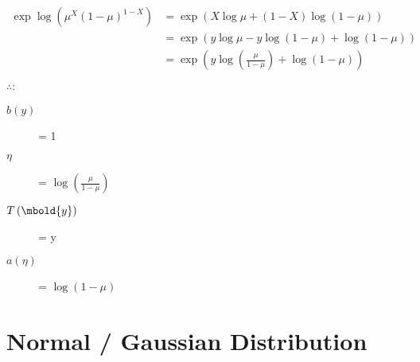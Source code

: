 \documentclass[12pt letter]{report}
\begin{document}
\begin{align*}
  \exp \log \left( \mu^{X} \left( 1 - \mu \right)^{1 - X} \right) & = \exp \left( X \log \mu + \left( 1 - X \right) \log \left( 1 - \mu \right) \right)                  \\
                                                                  & = \exp \left( y \log \mu  - y \log \left( 1 - \mu
  \right) + \log \left( 1 - \mu  \right)   \right)                                                                                                                       \\
                                                                  & = \exp \left( y \log \left( \frac{\mu  }{1 - \mu }  \right) + \log \left( 1 - \mu  \right)   \right) \\
\end{align*}
$\therefore$:
\begin{description}
  \item[ $b \left( y \right) $] = 1
  \item [ $\eta$] = $\log \left( \frac{\mu}{1 - \mu} \right)$
  \item[ $T \left( \mbold{y} \right) $] = y
  \item[ $a \left( \eta \right) $] = $\log \left( 1 - \mu  \right)$
\end{description}


\section{Normal / Gaussian Distribution}
\end{document}
